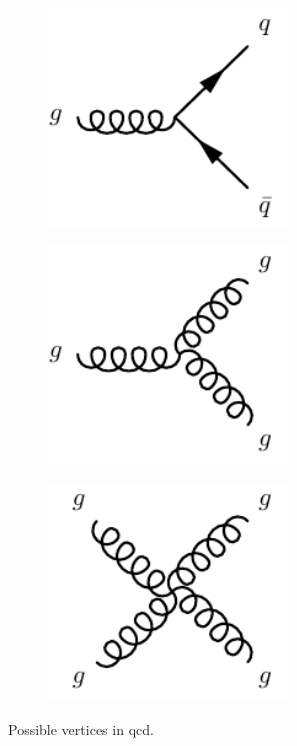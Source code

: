 \begin{figure}
	\centering
	\begin{subfigure}[b]{0.33\linewidth}
		\centering\includegraphics[width=0.7\textwidth]{gluon_quark_vertex}
	\end{subfigure}%
	\begin{subfigure}[b]{0.33\linewidth}
		\centering\includegraphics[width=0.7\textwidth]{gluon_vertex}
	\end{subfigure}	
	\begin{subfigure}[b]{0.33\linewidth}
		\centering\includegraphics[width=0.7\textwidth]{gluon_quartic_vertex}
	\end{subfigure}
	\caption{Possible vertices in \gls{qcd}.}
	\label{fig:qcd_vertices}
\end{figure}

